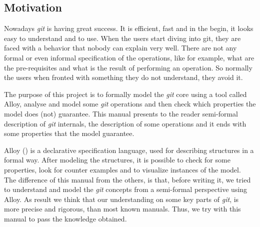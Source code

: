 \subsection{Motivation}
Nowadays \emph{git} is having great success. It is efficient, fast and
in the begin, it looks easy to understand and to use. When
the users start diving into git, they are faced with a behavior that
nobody can explain very well. There are not any formal or even informal
specification of the operations, like for example, what are the pre-requisites and
what is the result of performing an operation. So normally the users
when fronted with something they do not understand, they avoid it.\par
The purpose of this project is to
formally model the \emph{git} core using a tool called 
Alloy, analyse and model some \emph{git}
operations and then check which properties the model does (not)
guarantee. This manual presents to the reader semi-formal description of
\emph{git} internals, the description of some operations and it ends with
some properties that the model guarantee.\par
Alloy (\cite{Jackson:2006:SAL:1146359}) is a declarative specification language, used for describing structures in 
a formal way. After modeling the structures, it is possible to
check for some properties, look for counter examples and to visualize 
instances of the model. \\

The difference of this manual from the others, is
that, before writing it, we tried to understand and model 
the \emph{git} concepts from a semi-formal perspective using Alloy. As result 
we think that our understanding on some key parts of \emph{git}, is more precise
and rigorous, than most known manuals. Thus, we try with this manual
to pass the knowledge obtained. \par 


